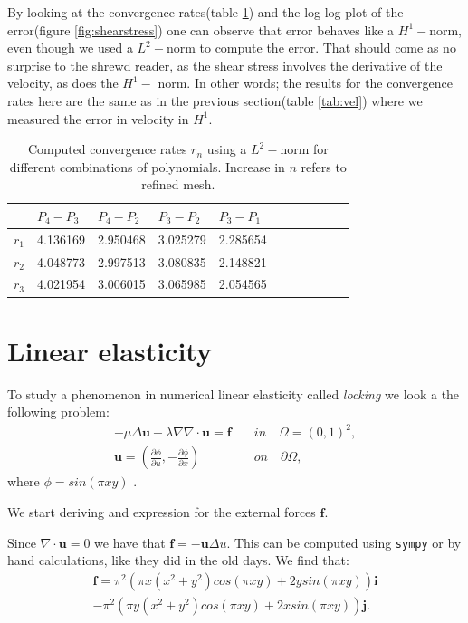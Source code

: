 \documentclass[11pt,a4paper,english]{article}
\numberwithin{equation}{section}
\begin{document}
By looking at the convergence rates(table \ref{tab:shear}) and the log-log plot of the error(figure \ref{fig:shearstress}) one can observe that error behaves like a $H^1-$norm, even though we used a $L^2-$norm to compute the error. That should come as no surprise to the shrewd reader, as the shear stress involves the derivative of the velocity, as does the $H^1-$ norm. In other words; the results for the convergence rates here are the same as in the previous section(table \ref{tab:vel}) where we measured the error in velocity in $H^1$.

\begin{table}[H]
\centering
\caption{Computed convergence rates $r_n$ using a $L^2-$norm for different combinations of polynomials. Increase in $n$ refers to refined mesh. }
\vspace{3mm}
\begin{tabular}{|l|l|l|l|l|l|l|l|l|l|l|}
\hline
 & $P_4-P_3$ & $P_4-P_2$ & $P_3-P_2$ & $P_3-P_1$ \\
\hline
$r_1$ & 4.136169 & 2.950468 & 3.025279 & 2.285654 \\
\hline
$r_2$ & 4.048773 & 2.997513 & 3.080835 & 2.148821 \\
\hline
$r_3$ & 4.021954 & 3.006015 & 3.065985 & 2.054565 \\
\hline
\end{tabular}
\label{tab:shear}
\end{table}

\newpage


\section{Linear elasticity}

To study a phenomenon in numerical linear elasticity called \emph{locking} we look a the following problem:
\begin{align}
-\mu \Delta \mathbf{u} - \lambda \nabla \nabla \cdot \mathbf{u} = \mathbf{f} \quad &in \quad \Omega=(0,1)^2 , \\
\mathbf{u} = \left( \frac{\partial \phi}{\partial u} , -\frac{\partial \phi}{\partial x} \right) \quad &on \quad \partial \Omega ,
\end{align}
where $\phi = sin(\pi x y)$ .

We start deriving and expression for the external forces $\mathbf{f}$.

Since $\nabla \cdot \mathbf{u} = 0$ we have that $\mathbf{f} = - \mathbf{u} \Delta u$. This can be computed using \texttt{sympy} or by hand calculations, like they did in the old days. We find that:
\begin{align*}
\mathbf{f} =  \pi^2(\pi x (x^2+y^2)cos(\pi xy)+ 2y sin(\pi x y)) \mathbf{i} \\ -\pi^2(\pi y(x^2+y^2)cos(\pi xy)+2x sin(\pi xy))\mathbf{j}.
\end{align*}
\end{document}
